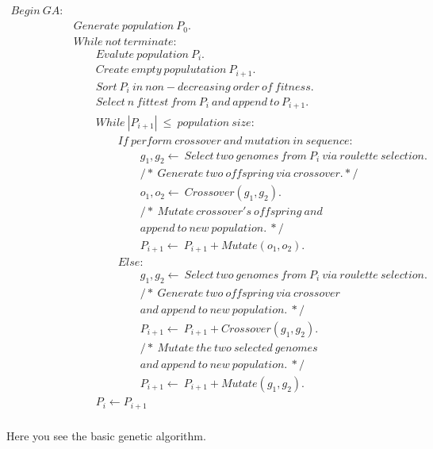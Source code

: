 \documentclass[a4paper,10pt]{article}
\begin{document}
\begin{figure}[H]
\begin{equation*}
\boxed{
\begin{aligned}
Begin \ GA: & \\
&Generate \ population \ P_0. \\
& While \ not \ terminate: \\
& \quad\quad Evalute \ population \ P_i. \\
& \quad\quad Create \ empty \ populutation \ P_{i+1}. \\
& \quad\quad Sort \ P_i \ in \ non\!-\!decreasing \ order \ of \ fitness. \\
& \quad\quad Select \ n \ fittest \ from \ P_i \ and \ append \ to \ P_{i+1}. \\
& \quad\quad While \ |P_{i+1}| \ \leq \  population \ size: \\
& \quad\quad\quad\quad If \ perform \ crossover \ and \ mutation \ in \ sequence: \\
& \quad\quad\quad\quad\quad\quad g_1,g_2 \longleftarrow \ Select \ two \ genomes \ from \ P_i \ via \ roulette \ selection. \\
& \quad\quad\quad\quad\quad\quad /\!* \ Generate \ two \ of\! fspring \ via \ crossover. *\!/ \\
& \quad\quad\quad\quad\quad\quad o_1,o_2 \longleftarrow \ Crossover( g_1, g_2 ). \\
& \quad\quad\quad\quad\quad\quad /\!* \ Mutate \ crossover's \ of\!fspring \ and \\
& \quad\quad\quad\quad\quad\quad append \ to \ new \ population. \ *\!/ \\
& \quad\quad\quad\quad\quad\quad P_{i+1} \longleftarrow \ P_{i+1} + Mutate( o_1, o_2 ). \\
& \quad\quad\quad\quad Else: \\
& \quad\quad\quad\quad\quad\quad g_1,g_2 \longleftarrow \ Select \ two \ genomes \ from \ P_i \ via \ roulette \ selection. \\
& \quad\quad\quad\quad\quad\quad /\!* \ Generate \ two \ of\!fspring \ via \ crossover \\
& \quad\quad\quad\quad\quad\quad and \ append \ to \ new \ population. \ *\!/  \\
& \quad\quad\quad\quad\quad\quad P_{i+1} \longleftarrow \ P_{i+1} + Crossover( g_1, g_2 ). \\
& \quad\quad\quad\quad\quad\quad /\!* \ Mutate \ the \ two \ selected \ genomes \\
& \quad\quad\quad\quad\quad\quad and \ append \ to \ new \ population. \ *\!/  \\
& \quad\quad\quad\quad\quad\quad P_{i+1} \longleftarrow \ P_{i+1} + Mutate( g_1, g_2 ). \\
& \quad\quad P_{i} \longleftarrow P_{i+1}\\
\end{aligned}
}
\end{equation*}
\caption{Here you see the basic genetic algorithm.}
\label{fig:ga}
\end{figure}
\end{document}
